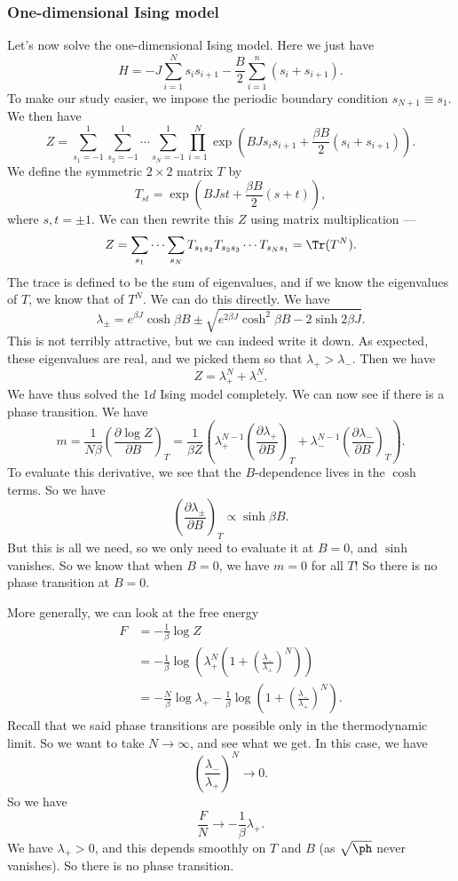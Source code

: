 \documentclass[a4paper]{article}
\begin{document}
\subsubsection*{One-dimensional Ising model}
Let's now solve the one-dimensional Ising model. Here we just have
\[
  H = -J \sum_{i = 1}^N s_i s_{i + 1} - \frac{B}{2} \sum_{i = 1}^n (s_i + s_{i + 1}).
\]
To make our study easier, we impose the periodic boundary condition $s_{N + 1} \equiv s_1$. We then have
\[
  Z = \sum_{s_1 = -1}^1 \sum_{s_2 = -1}^1 \cdots \sum_{s_N = -1}^1 \prod_{i = 1}^N \exp\left(B J s_i s_{i + 1} + \frac{\beta B}{2} (s_i + s_{i + 1})\right).
\]
We define the symmetric $2 \times 2$ matrix $T$ by
\[
  T_{st} = \exp\left(BJst + \frac{\beta B}{2} (s + t)\right),
\]
where $s, t = \pm 1$. We can then rewrite this $Z$ using matrix multiplication ---
\[
  Z = \sum_{s_1} \cdots \sum_{s_N} T_{s_1 s_2} T_{s_2 s_3} \cdots T_{s_N s_1} = \Tr (T^N).
\]
The trace is defined to be the sum of eigenvalues, and if we know the eigenvalues of $T$, we know that of $T^N$. We can do this directly. We have
\[
  \lambda_{\pm} = e^{\beta J} \cosh \beta B \pm \sqrt{e^{2\beta J} \cosh^2 \beta B - 2 \sinh 2 \beta J}.
\]
This is not terribly attractive, but we can indeed write it down. As expected, these eigenvalues are real, and we picked them so that $\lambda_+ > \lambda_-$. Then we have
\[
  Z = \lambda_+^N + \lambda_-^N.
\]
We have thus solved the $1d$ Ising model completely. We can now see if there is a phase transition. We have
\[
  m = \frac{1}{N\beta} \left(\frac{\partial \log Z}{\partial B}\right)_T = \frac{1}{\beta Z} \left(\lambda_+^{N - 1} \left(\frac{\partial \lambda_+}{\partial B}\right)_T + \lambda_-^{N - 1} \left(\frac{\partial \lambda_-}{\partial B}\right)_T\right).
\]
To evaluate this derivative, we see that the $B$-dependence lives in the $\cosh$ terms. So we have
\[
  \left( \frac{\partial \lambda_{\pm}}{\partial B}\right)_T \propto \sinh \beta B.
\]
But this is all we need, so we only need to evaluate it at $B = 0$, and $\sinh$ vanishes. So we know that when $B = 0$, we have $m = 0$ for all $T$! So there is no phase transition at $B = 0$.

More generally, we can look at the free energy
\begin{align*}
  F &= - \frac{1}{\beta} \log Z \\
  &= -\frac{1}{\beta} \log \left(\lambda_+^N \left( 1 + \left(\frac{\lambda_-}{\lambda_+}\right)^N\right)\right)\\
  &= - \frac{N}{\beta} \log \lambda_+ - \frac{1}{\beta} \log \left(1 + \left(\frac{\lambda_-}{\lambda_+}\right)^N\right).
\end{align*}
Recall that we said phase transitions are possible only in the thermodynamic limit. So we want to take $N \to \infty$, and see what we get. In this case, we have
\[
  \left(\frac{\lambda_-}{\lambda_+}\right)^N \to 0.
\]
So we have
\[
  \frac{F}{N} \to - \frac{1}{\beta} \lambda_+.
\]
We have $\lambda_+ > 0$, and this depends smoothly on $T$ and $B$ (as $\sqrt{\ph}$ never vanishes). So there is no phase transition.
\end{document}
